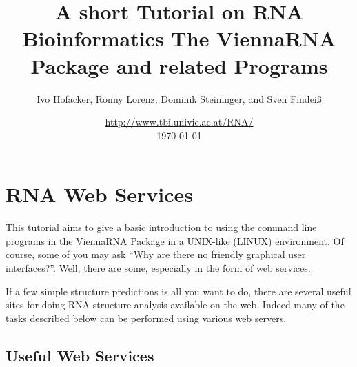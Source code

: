 \documentclass[a4paper]{article}
\title{A short Tutorial on RNA Bioinformatics\newline
{\small The ViennaRNA Package and related Programs}}
\author{Ivo Hofacker, Ronny Lorenz, Dominik Steininger, and Sven Findei{\ss}}
\date{\url{http://www.tbi.univie.ac.at/RNA/}\\[1ex]\today}
\newcommand{\frametitle}[1]{\subsubsection{#1}}
\begin{document}


\maketitle
\newpage

\tableofcontents
\newpage


\section{RNA Web Services}
This tutorial aims to give a basic introduction to using the command line
programs in the ViennaRNA Package in a UNIX-like (LINUX) environment.
Of course, some of you may ask ``Why are there no friendly graphical user
interfaces?''. Well, there are some, especially in the form of web
services. 

If a few simple structure predictions is all you want to do, there are
several useful sites for doing RNA structure analysis available
on the web. Indeed many of the tasks described below can be performed using
various web servers.

\subsection{Useful Web Services}
\end{document}
